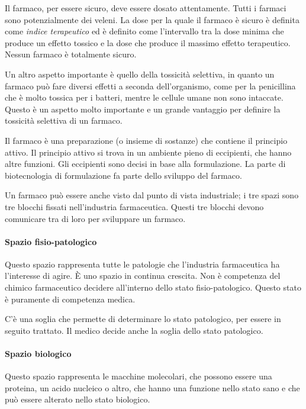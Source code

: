 Il farmaco, per essere sicuro, deve essere dosato attentamente. Tutti i farmaci sono potenzialmente dei veleni. La dose per la quale il farmaco è sicuro è definita come \emph{indice terapeutico} ed è definito come l'intervallo tra la dose minima che produce un effetto tossico e la dose che produce il massimo effetto terapeutico.
Nessun farmaco è totalmente sicuro.

Un altro aspetto importante è quello della tossicità selettiva, in quanto un farmaco può fare diversi effetti a seconda dell'organismo, come per la penicillina che è molto tossica per i batteri, mentre le cellule umane non sono intaccate.
Questo è un aspetto molto importante e un grande vantaggio per definire la tossicità selettiva di un farmaco.

Il farmaco è una preparazione (o insieme di sostanze) che contiene il principio attivo. Il principio attivo si trova in un ambiente pieno di eccipienti, che hanno altre funzioni. Gli eccipienti sono decisi in base alla formulazione. La parte di biotecnologia di formulazione fa parte dello sviluppo del farmaco.


Un farmaco può essere anche visto dal punto di vista industriale; i tre spazi sono tre blocchi fissati nell'industria farmaceutica. Questi tre blocchi devono comunicare tra di loro per sviluppare un farmaco.


\paragraph{Spazio fisio-patologico}
Questo spazio rappresenta tutte le patologie che l'industria farmaceutica ha l'interesse di agire. È uno spazio in continua crescita. Non è competenza del chimico farmaceutico decidere all'interno dello stato fisio-patologico. Questo stato è puramente di competenza medica.

C'è una soglia che permette di determinare lo stato patologico, per essere in seguito trattato. Il medico decide anche la soglia dello stato patologico.

\paragraph{Spazio biologico}
Questo spazio rappresenta le macchine molecolari, che possono essere una proteina, un acido nucleico o altro, che hanno una funzione nello stato sano e che può essere alterato nello stato biologico.


